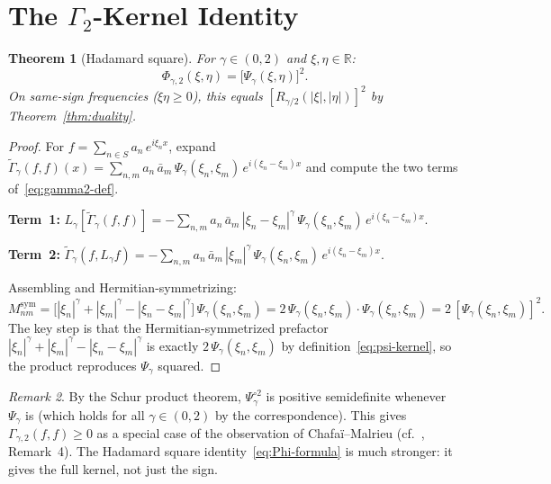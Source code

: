 \documentclass[11pt,a4paper]{article}
\theoremstyle{plain}
\newtheorem{theorem}{Theorem}[section]
\theoremstyle{definition}
\theoremstyle{remark}
\newtheorem{remark}[theorem]{Remark}
\newcommand{\R}{\mathbb{R}}
\begin{document}
\section{The $\Gamma_2$-Kernel Identity}\label{sec:gamma2}

\begin{theorem}[Hadamard square]\label{thm:gamma2-kernel}
For $\gamma \in (0,2)$ and $\xi,\eta \in \R$:
\begin{equation}\label{eq:Phi-formula}
  \Phi_{\gamma,2}(\xi,\eta) = \bigl[\Psi_\gamma(\xi,\eta)\bigr]^2.
\end{equation}
On same-sign frequencies ($\xi\eta \geq 0$), this equals
$[R_{\gamma/2}(|\xi|,|\eta|)]^2$ by
Theorem~\ref{thm:duality}.
\end{theorem}

\begin{proof}
For $f = \sum_{n \in S} a_n\,e^{i\xi_n x}$, expand
$\widetilde{\Gamma}_\gamma(f,f)(x)
= \sum_{n,m} a_n\,\bar{a}_m\,\Psi_\gamma(\xi_n,\xi_m)\,
  e^{i(\xi_n-\xi_m)x}$
and compute the two terms of~\eqref{eq:gamma2-def}.

\textbf{Term~1:}
$L_\gamma[\widetilde{\Gamma}_\gamma(f,f)] =
-\sum_{n,m} a_n\,\bar{a}_m\,|\xi_n-\xi_m|^\gamma\,
\Psi_\gamma(\xi_n,\xi_m)\,e^{i(\xi_n-\xi_m)x}$.

\textbf{Term~2:}
$\widetilde{\Gamma}_\gamma(f, L_\gamma f) =
-\sum_{n,m} a_n\,\bar{a}_m\,|\xi_m|^\gamma\,
\Psi_\gamma(\xi_n,\xi_m)\,e^{i(\xi_n-\xi_m)x}$.

Assembling and Hermitian-symmetrizing:
\[
  M_{nm}^{\mathrm{sym}}
  = \bigl[|\xi_n|^\gamma + |\xi_m|^\gamma - |\xi_n-\xi_m|^\gamma\bigr]\,
  \Psi_\gamma(\xi_n,\xi_m)
  = 2\,\Psi_\gamma(\xi_n,\xi_m)\cdot\Psi_\gamma(\xi_n,\xi_m)
  = 2\,[\Psi_\gamma(\xi_n,\xi_m)]^2.
\]
The key step is that the Hermitian-symmetrized prefactor
$|\xi_n|^\gamma + |\xi_m|^\gamma - |\xi_n-\xi_m|^\gamma$
is exactly $2\,\Psi_\gamma(\xi_n,\xi_m)$ by definition~\eqref{eq:psi-kernel},
so the product reproduces $\Psi_\gamma$ squared.
\end{proof}

\begin{remark}\label{rem:hadamard}
By the Schur product theorem, $\Psi_\gamma^{\circ 2}$ is positive
semidefinite whenever $\Psi_\gamma$ is (which holds for all
$\gamma \in (0,2)$ by the correspondence). This gives $\Gamma_{\gamma,2}(f,f) \geq 0$
as a special case of the observation of Chafa\"i--Malrieu
(cf.~\cite{GentilImbert2008}, Remark~4). The Hadamard square
identity~\eqref{eq:Phi-formula} is much stronger: it gives the
full kernel, not just the sign.
\end{remark}
\end{document}
